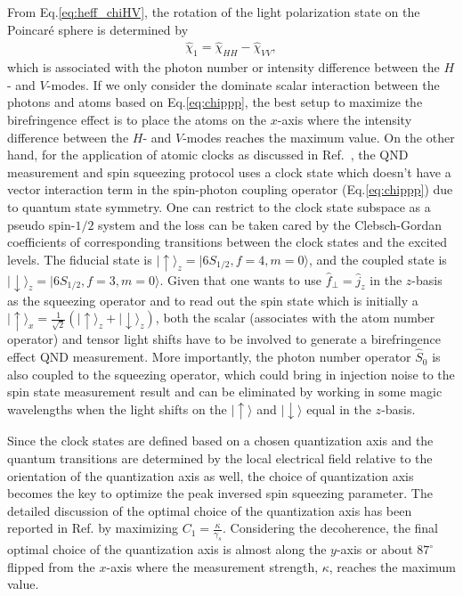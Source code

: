 \documentclass[aps,pra,twocolumn,superscriptaddress]{revtex4-1} %
\def\ket#1{\lvert{#1}\rangle}%
\newcommand{\Poincare}{Poincar\'e\xspace}
\begin{document}
From Eq.\eqref{eq:heff_chiHV}, the rotation of the light polarization state on the \Poincare sphere is determined by 
\begin{align}
\hat{\chi}_1=\hat{\chi}_{HH}-\hat{\chi}_{VV},
\end{align}
which is associated with the photon number or intensity difference between the $ H $- and $ V $-modes.
If we only consider the dominate scalar interaction between the photons and atoms based on Eq.\eqref{eq:chippp}, the best setup to maximize the birefringence effect is to place the atoms on the $ x $-axis where the intensity difference between the $ H $- and $ V $-modes reaches the maximum value. 
On the other hand, for the application of atomic clocks as discussed in Ref.~\cite{Qi2016}, the QND measurement and spin squeezing protocol uses a clock state which doesn't have a vector interaction term in the spin-photon coupling operator
(Eq.\eqref{eq:chippp}) due to quantum state symmetry. 
One can restrict to the clock state subspace as a pseudo spin-$ 1/2 $ system and the loss can be taken cared by the Clebsch-Gordan coefficients of corresponding transitions between the clock states and the excited levels.
The fiducial state is $ \ket{\uparrow}_z=\ket{6S_{1/2},f=4,m=0} $, and the coupled state is $ \ket{\downarrow}_z=\ket{6S_{1/2},f=3,m=0} $.
Given that one wants to use $ \hat{f}_\perp=\hat{j}_z $ in the $ z $-basis as the squeezing operator and to read out the spin state which is initially a $ \ket{\uparrow}_x=\frac{1}{\sqrt{2}}(\ket{\uparrow}_z+\ket{\downarrow}_z) $, both the scalar (associates with the atom number operator) and tensor light shifts have to be involved to generate a birefringence effect QND measurement. 
More importantly, the photon number operator $ \hat{S}_0 $ is also coupled to the squeezing operator, which could bring in injection noise to the spin state measurement result and can be eliminated by working in some magic wavelengths when the light shifts on the $ \ket{\uparrow} $ and $ \ket{\downarrow} $ equal in the $ z $-basis.

Since the clock states are defined based on a chosen quantization axis and the quantum transitions are determined by the local electrical field relative to the orientation of the quantization axis as well, the choice of quantization axis becomes the key to optimize the peak inversed spin squeezing parameter.
The detailed discussion of the optimal choice of the quantization axis has been reported in Ref.\cite{Qi2016} by maximizing $ C_1=\frac{\kappa}{\gamma_s} $. 
Considering the decoherence, the final optimal choice of the quantization axis is almost along the $ y $-axis or about $ 87^\circ $ flipped from the $ x $-axis where the measurement strength, $ \kappa $, reaches the maximum value.
\end{document}
